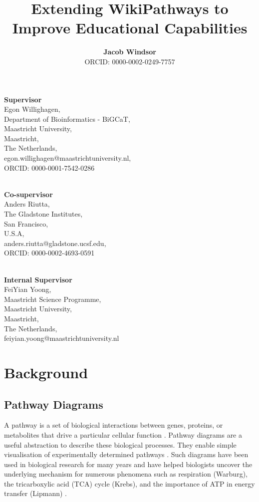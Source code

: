 \documentclass[a4paper,12pt,twoside]{apa}
\title{\LARGE {\bf Extending WikiPathways to Improve Educational Capabilities}\\
 \vspace*{6mm}
}
\author{\textbf{Jacob Windsor} \\ \small{ORCID: 0000-0002-0249-7757}}
\begin{document}
\maketitle

{\raggedright{}
\textbf{Supervisor} \\
Egon Willighagen, \\
Department of Bioinformatics - BiGCaT, \\
Maastricht University, \\
Maastricht, \\
The Netherlands, \\
egon.willighagen@maastrichtuniversity.nl, \\
ORCID: 0000-0001-7542-0286

~\\
\textbf{Co-supervisor} \\
Anders Riutta, \\
The Gladstone Institutes,\\
San Francisco, \\
U.S.A, \\
anders.riutta@gladstone.ucsf.edu, \\
ORCID: 0000-0002-4693-0591

~\\
\textbf{Internal Supervisor} \\
FeiYian Yoong, \\
Maastricht Science Programme, \\
Maastricht University, \\
Maastricht, \\
The Netherlands, \\
feiyian.yoong@maastrichtuniversity.nl \\
}

\section{Background}
\subsection{Pathway Diagrams}
A pathway is a set of biological interactions between genes, proteins, or metabolites that drive a particular cellular function \cite{wu2010human}. Pathway diagrams are a useful abstraction to describe these biological processes. They enable simple visualisation of experimentally determined pathways \cite{bohler2016reactome}. Such diagrams have been used in biological research for many years and have helped biologists uncover the underlying mechanism for numerous phenomena such as respiration (Warburg), the tricarboxylic acid (TCA) cycle (Krebs), and the importance of ATP in energy transfer (Lipmann) \cite{deberardinis2012cellular}.
\end{document}

